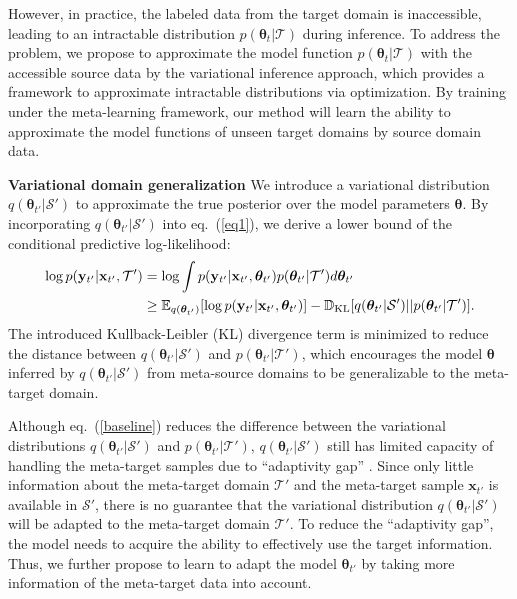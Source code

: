 \documentclass{article} \usepackage[table]{xcolor}
\newcommand{\x}{\mathbf{x}}
\newcommand{\y}{\mathbf{y}}
\newcommand{\dkl}{\mathbb{D}_{\rm{KL}}}
\newcommand{\btheta}{\boldsymbol{\theta}}
\begin{document}
However, in practice, the labeled data from the target domain is inaccessible, leading to an intractable distribution $p(\btheta_{t}|\mathcal{T})$ during inference.
To address the problem, we propose to approximate the model function $p(\btheta_{t}|\mathcal{T})$ with the accessible source data by the variational inference approach, which provides a framework to approximate intractable distributions via optimization.
By training under the meta-learning framework, our method will learn the ability to approximate the model functions of unseen target domains by source domain data.


\textbf{Variational domain generalization} 
We introduce  a variational distribution $q(\btheta_{t'}|\mathcal{S'})$ to approximate the true posterior over the model parameters $\btheta$. By incorporating $q(\btheta_{t'}|\mathcal{S'})$ into eq.~(\ref{eq1}), we derive a lower bound of the conditional predictive log-likelihood:
\begin{equation}
\begin{aligned}
\label{baseline}
    \log p(\y_{t'}|\x_{t'}, \mathcal{T'}) & = \log \int p(\y_{t'}|\x_{t'}, \btheta_{t'})p(\btheta_{t'}|\mathcal{T'})d\btheta_{t'} \\
    & \geq \mathbb{E}_{q(\btheta_{t'})}[\log p(\y_{t'}|\x_{t'}, \btheta_{t'})] - \dkl [q(\btheta_{t'}|\mathcal{S'}) || p(\btheta_{t'}|\mathcal{T'})].
\end{aligned}
\end{equation}
The introduced Kullback-Leibler (KL) divergence term is minimized to reduce the distance between $q(\btheta_{t'}|\mathcal{S'})$ and $p(\btheta_{t'}|\mathcal{T'})$, which encourages the model $\btheta$ inferred by $q(\btheta_{t'}|\mathcal{S'})$ from meta-source domains to be generalizable to the meta-target domain.


Although eq.~(\ref{baseline}) reduces the difference between the variational distributions $q(\btheta_{t'}|\mathcal{S'})$ and $p(\btheta_{t'}|\mathcal{T'})$, 
$q(\btheta_{t'}|\mathcal{S'})$ still has limited capacity of handling the meta-target samples due to ``adaptivity gap'' \citep{dubey2021adaptive}.
Since only little information about the meta-target domain $\mathcal{T'}$ and the meta-target sample $\x_{t'}$ is available in $\mathcal{S'}$, there is no guarantee that the variational distribution $q(\btheta_{t'}|\mathcal{S'})$ will be adapted to the meta-target domain $\mathcal{T'}$. 
To reduce the ``adaptivity gap'', the model needs to acquire the ability to effectively use the target information.
Thus, we further propose to learn to adapt the model $\btheta_{t'}$ by taking more information of the meta-target data into account.
\end{document}
